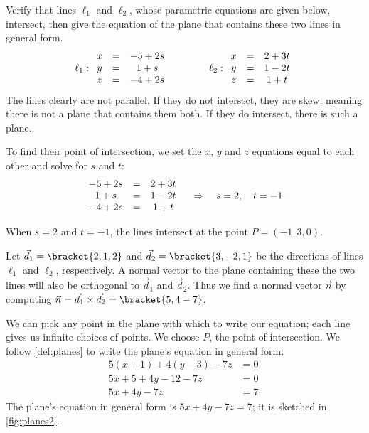 \begin{example}\label{ex_planes2}
Verify that lines $\ell_1$ and $\ell_2$, whose parametric equations are given below, intersect, then give the equation of the  plane that contains these two lines in general form.
\[
 \ell_1: \begin{array}{ c c c } x&=&-5+2s \\ y&=&1+s \\ z&=&-4+2s\end{array}
 \qquad\qquad
 \ell_2: \begin{array}{ c c c } x &=& 2+3t\\ y&=&1-2t \\ z&=&1+t\end{array}
\]
\solution
The lines clearly are not parallel. If they do not intersect, they are skew, meaning there is not a plane that contains them both. If they do intersect, there is such a plane. 

To find their point of intersection, we set the $x$, $y$ and $z$ equations equal to each other and solve for $s$ and $t$:
\[
 \begin{array}{ c c c }-5+2s &=&2+3t \\ 1+s &=& 1-2t \\ -4+2s &=& 1+t \end{array}
 \quad  \Rightarrow  \quad s=2,\quad t=-1.
\]

When $s=2$ and $t=-1$, the lines intersect at the point $P= (-1,3,0)$. 

Let $\vec d_1 =\bracket{2,1,2}$ and $\vec d_2=\bracket{3,-2,1}$ be the directions of lines $\ell_1$ and $\ell_2$, respectively. A normal vector to the plane containing these the two lines will also be orthogonal to $\vec d_1$ and $\vec d_2$. Thus we find a normal vector $\vec n$ by computing $\vec n = \vec d_1 \times \vec d_2=\bracket{5,4-7}$.

We can pick any point in the plane with which to write our equation; each line gives us infinite choices of points. We choose $P$, the point of intersection. We follow \autoref{def:planes} to write the plane's equation in general form:
\begin{align*}
5(x+1) +4(y-3) -7z &= 0 \\
5x + 5 + 4y-12 -7z &= 0\\
5x+4y-7z &= 7.
\end{align*}
The plane's equation in general form is $5x+4y-7z=7$; it is sketched in \autoref{fig:planes2}.
\end{example}


